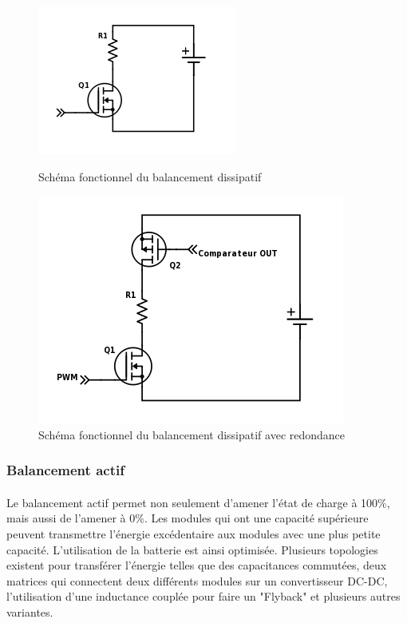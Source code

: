\begin{figure}[H]
	\begin{minipage}{0.5\textwidth}
		\centering
		\includegraphics[scale=0.9]{Images/Dissipative_balancing.png}
		\caption{Schéma fonctionnel du balancement dissipatif}
		\label{fig:bal_dis}
	\end{minipage}
	\hfill
	\begin{minipage}{0.45\textwidth}
		\centering
		\includegraphics[scale=0.6]{Images/Dissipative_bal_comp.png}
		\caption{Schéma fonctionnel du balancement dissipatif avec redondance}
		\label{fig:bal_dis_comp}
	\end{minipage}	
\end{figure}

\subsubsection*{Balancement actif}
\paragraph*{}
Le balancement actif permet non seulement d'amener l'état de charge à 100\%, mais aussi de l'amener à 0\%. Les modules qui ont une capacité supérieure peuvent transmettre l'énergie excédentaire aux modules avec une plus petite capacité. L'utilisation de la batterie est ainsi optimisée. Plusieurs topologies existent pour transférer l'énergie telles que des capacitances commutées, deux matrices qui connectent deux différents modules sur un convertisseur DC-DC, l'utilisation d'une inductance couplée pour faire un "Flyback" et plusieurs autres variantes. 

